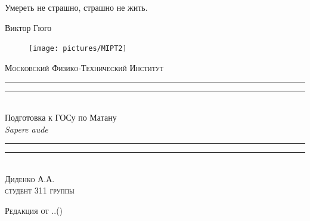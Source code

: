 \newpage
\thispagestyle{empty}
\begingroup
{}
\epigraph{Умереть не страшно, страшно не жить.}{Виктор Гюго}\centering

\settowidth{\unitlength}{\LARGE\scshape Московский Физико-Технический Институт}
\vspace{-1.8\baselineskip}
\begin{figure}[!h]
\center
\texttt{[image: pictures/MIPT2]}
\end{figure}
\vspace*{0.5\baselineskip}
{\LARGE\scshape Московский Физико-Технический Институт}\\[0.7\baselineskip]
\rule{\unitlength}{1.6pt}\vspace*{-\baselineskip}\vspace*{2pt}
\rule{\unitlength}{0.4pt}\\[1.4\baselineskip]
{\Huge Подготовка к ГОСу по Матану}\\[\baselineskip]
{\large \itshape Sapere aude}\\[0.8\baselineskip]
\rule{\unitlength}{0.4pt}\vspace*{-1.5\baselineskip}\vspace{3.2pt}
\rule{\unitlength}{1.6pt}\\[\baselineskip]
{\Large\scshape Диденко А.А. \\\vspace*{0.2\baselineskip}  \normalsize студент 311 группы}\par
\vspace*{\baselineskip}  

{\LARGE\scshape Редакция от \twodigit\day.\twodigit\month.\the\year \;(\currenttime)}\par %

\bigskip
\vfill

